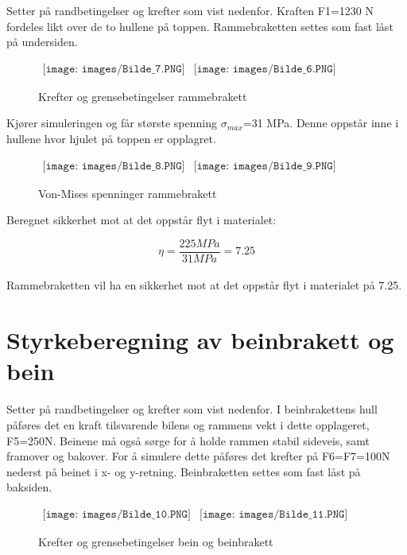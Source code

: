 Setter på randbetingelser og krefter som vist nedenfor. Kraften F1=1230 N fordeles likt over de to hullene på toppen. Rammebraketten settes som fast låst på undersiden.

\begin{figure}[h]
\begin{center}$
\begin{array}{ccc}
\texttt{[image: images/Bilde\_7.PNG]} &
\texttt{[image: images/Bilde\_6.PNG]} &  
\end{array}$
\end{center}
\caption{Krefter og grensebetingelser rammebrakett}
\end{figure}

Kjører simuleringen og får største spenning $\sigma_{max}$=31 MPa. Denne oppstår inne i hullene hvor hjulet på toppen er opplagret.

\begin{figure}[h]
\begin{center}$
\begin{array}{ccc}
\texttt{[image: images/Bilde\_8.PNG]} &
\texttt{[image: images/Bilde\_9.PNG]} &  
\end{array}$
\end{center}
\caption{Von-Mises spenninger rammebrakett}
\end{figure}

Beregnet sikkerhet mot at det oppstår flyt i materialet:

\begin{equation}
\eta=\frac{225 MPa}{31 MPa}=7.25
\end{equation}\\

Rammebraketten vil ha en sikkerhet mot at det oppstår flyt i materialet på 7.25.\newpage

\section{Styrkeberegning av beinbrakett og bein}
Setter på randbetingelser og krefter som vist nedenfor. I beinbrakettens hull påføres det en kraft tilsvarende bilens og rammens vekt i dette opplageret, F5=250N. Beinene må også sørge for å holde rammen stabil sideveis, samt framover og bakover. For å simulere dette påføres det krefter på F6=F7=100N nederst på beinet i x- og y-retning. Beinbraketten settes som fast låst på baksiden.

\begin{figure}[h]
\begin{center}$
\begin{array}{ccc}
\texttt{[image: images/Bilde\_10.PNG]} &
\texttt{[image: images/Bilde\_11.PNG]} &  
\end{array}$
\end{center}
\caption{Krefter og grensebetingelser bein og beinbrakett}
\end{figure}

